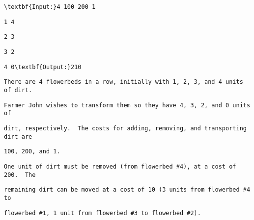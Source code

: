 \begin{verbatim}
\textbf{Input:}4 100 200 1 \end{verbatim}
\begin{verbatim}
1 4 \end{verbatim}
\begin{verbatim}
2 3 \end{verbatim}
\begin{verbatim}
3 2 \end{verbatim}
\begin{verbatim}
4 0\textbf{Output:}210\end{verbatim}
\begin{verbatim}
There are 4 flowerbeds in a row, initially with 1, 2, 3, and 4 units of dirt. \end{verbatim}
\begin{verbatim}
Farmer John wishes to transform them so they have 4, 3, 2, and 0 units of \end{verbatim}
\begin{verbatim}
dirt, respectively.  The costs for adding, removing, and transporting dirt are \end{verbatim}
\begin{verbatim}
100, 200, and 1.\end{verbatim}
\begin{verbatim}
One unit of dirt must be removed (from flowerbed #4), at a cost of 200.  The \end{verbatim}
\begin{verbatim}
remaining dirt can be moved at a cost of 10 (3 units from flowerbed #4 to \end{verbatim}
\begin{verbatim}
flowerbed #1, 1 unit from flowerbed #3 to flowerbed #2).\end{verbatim}